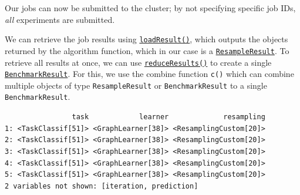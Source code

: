 Our jobs can now be submitted to the cluster; by not specifying specific
job IDs, \emph{all} experiments are submitted.

\begin{Shaded}
\begin{Highlighting}[]
\NormalTok{(}
\end{Highlighting}
\end{Shaded}

We can retrieve the job results using
\href{https://www.rdocumentation.org/packages/batchtools/topics/loadResult}{\texttt{loadResult()}},
which outputs the objects returned by the algorithm function, which in
our case is a
\href{https://mlr3.mlr-org.com/reference/ResampleResult.html}{\texttt{ResampleResult}}.
To retrieve all results at once, we can use
\href{https://www.rdocumentation.org/packages/batchtools/topics/reduceResults}{\texttt{reduceResults()}}
to create a single
\href{https://mlr3.mlr-org.com/reference/BenchmarkResult.html}{\texttt{BenchmarkResult}}.
For this, we use the combine function \texttt{c()} which can combine
multiple objects of type \texttt{ResampleResult} or
\texttt{BenchmarkResult} to a single \texttt{BenchmarkResult}.

\begin{Shaded}
\begin{Highlighting}[]
\OtherTok{=} \NormalTok{(}\NormalTok{, }
\NormalTok{(rr)[}\SpecialCharTok{:}\NormalTok{]}
\end{Highlighting}
\end{Shaded}

\begin{verbatim}
                task            learner             resampling
1: <TaskClassif[51]> <GraphLearner[38]> <ResamplingCustom[20]>
2: <TaskClassif[51]> <GraphLearner[38]> <ResamplingCustom[20]>
3: <TaskClassif[51]> <GraphLearner[38]> <ResamplingCustom[20]>
4: <TaskClassif[51]> <GraphLearner[38]> <ResamplingCustom[20]>
5: <TaskClassif[51]> <GraphLearner[38]> <ResamplingCustom[20]>
2 variables not shown: [iteration, prediction]
\end{verbatim}

\begin{Shaded}
\begin{Highlighting}[]
\OtherTok{=} 
\SpecialCharTok{$}\NormalTok{()[}\SpecialCharTok{:}\NormalTok{]}
\end{Highlighting}
\end{Shaded}

